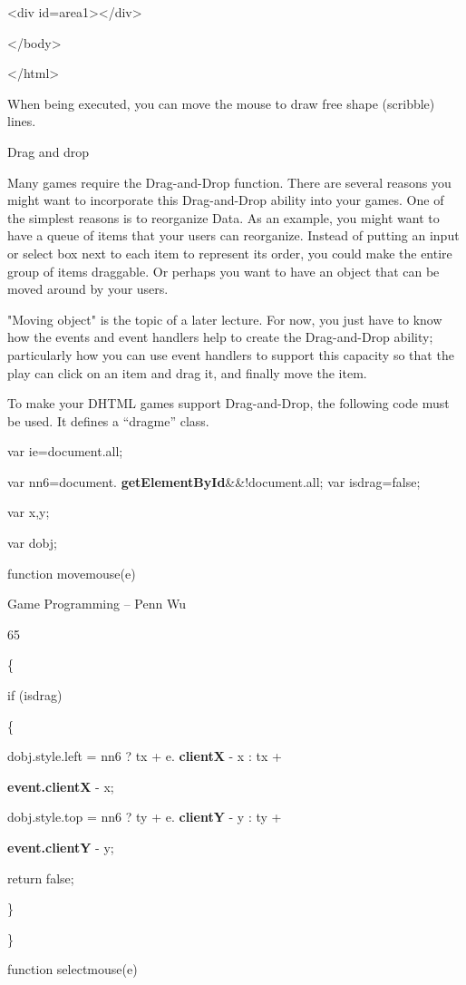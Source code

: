 \documentclass[
]{article}
\begin{document}
\textless div id=area1\textgreater\textless/div\textgreater{}

\textless/body\textgreater{}

\textless/html\textgreater{}

When being executed, you can move the mouse to draw free shape
(scribble) lines.

Drag and drop

Many games require the Drag-and-Drop function. There are several reasons
you might want to incorporate this Drag-and-Drop ability into your
games. One of the simplest reasons is to reorganize Data. As an example,
you might want to have a queue of items that your users can reorganize.
Instead of putting an input or select box next to each item to represent
its order, you could make the entire group of items draggable. Or
perhaps you want to have an object that can be moved around by your
users.

"Moving object" is the topic of a later lecture. For now, you just have
to know how the events and event handlers help to create the
Drag-and-Drop ability; particularly how you can use event handlers to
support this capacity so that the play can click on an item and drag it,
and finally move the item.

To make your DHTML games support Drag-and-Drop, the following code must
be used. It defines a ``dragme'' class.

var ie=document.all;

var nn6=document. \textbf{getElementById}\&\&!document.all; var
isdrag=false;

var x,y;

var dobj;

function movemouse(e)

Game Programming -- Penn Wu

65

\protect\hypertarget{index_split_005.htmlux5cux23p66}{}{}\{

if (isdrag)

\{

dobj.style.left = nn6 ? tx + e. \textbf{clientX} - x : tx +

\textbf{event.clientX} - x;

dobj.style.top = nn6 ? ty + e. \textbf{clientY} - y : ty +

\textbf{event.clientY} - y;

return false;

\}

\}

function selectmouse(e)
\end{document}
